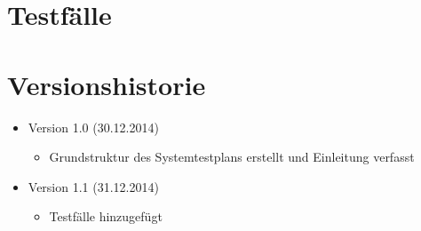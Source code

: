 \documentclass[11pt]{article}
\begin{document}
\newpage

\section{Testfälle}



\newpage

\section{Versionshistorie}

\begin{itemize}
	\item Version 1.0 (30.12.2014)
	\begin{itemize}
		\item Grundstruktur des Systemtestplans erstellt und Einleitung verfasst
	\end{itemize}
	\item Version 1.1 (31.12.2014)
	\begin{itemize}
		\item Testfälle hinzugefügt
	\end{itemize}
\end{itemize}
\end{document}
